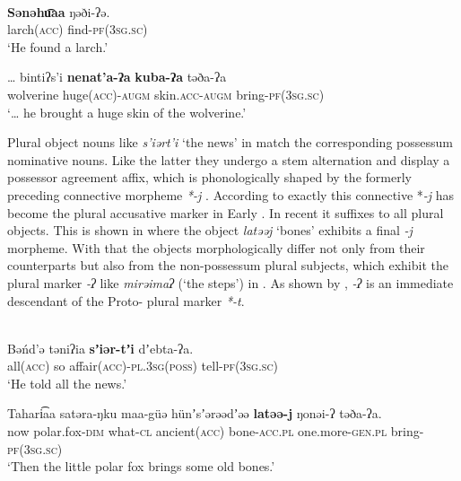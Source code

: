 \documentclass[output=paper]{LSP/langsci}
\begin{document}
\ea%
\label{12-wr-ex:2}
\\
\ea\label{12-wr-ex:2a}
\gll \textbf{Sənəhu͡aa} ŋəði-ʔə.\\
 larch\textsc{(acc)} find-\textsc{pf(3sg.sc)}\\
\glt ‘He found a larch.’

\ex\label{12-wr-ex:2b}
\gll … bintiʔs’i \textbf{nenat’a-ʔa} \textbf{kuba-ʔa} təða-ʔa\\
 {} wolverine huge\textsc{(acc)}-\textsc{augm} skin\textsc{.acc}-\textsc{augm} bring-\textsc{pf(3sg.sc)}\\
\glt ‘… he brought a huge skin of the wolverine.’
\z
\z

Plural  object nouns like \textit{s’iərt’i} ‘the news’ in  match the corresponding possessum nominative nouns. Like the latter they undergo a stem alternation and display a possessor agreement affix, which is phonologically shaped by the formerly preceding connective morpheme \textit{*-j} \citep[84]{WagnerNagy2002Chrestomathia}. According to \citet[29--32]{Janhunen1982Structure} exactly this  connective *\textit{-j} has become the plural accusative marker in Early . In recent  it suffixes to all  plural objects. This is shown in  where the  object \textit{latəəj} ‘bones’ exhibits a final \textit{-j} morpheme. With that the  objects morphologically differ not only from their  counterparts but also from the non-possessum plural subjects, which exhibit the plural marker \textit{-ʔ} like \textit{mirəimaʔ} (‘the steps’) in . As shown by \citet[238]{Mikola1988Geschichte}, \textit{-ʔ} is an immediate descendant of the Proto- plural marker \textit{*-t}. 

\ea \label{12-wr-ex:3}
\\

\ea \label{12-wr-ex:3a}
\gll Bəńd’ə təniʔia \textbf{sʼiər-tʼi} dʼebta-ʔa.\\
 all\textsc{(acc)} so affair\textsc{(acc)}-\textsc{pl.3sg(poss)} tell-\textsc{pf(3sg.sc)}\\
\glt  ‘He told all the news.’ %

\ex \label{12-wr-ex:3b}
\gll Tahari͡aa satəra-ŋku maa-güǝ hünʼsʼərəədʼəə \textbf{latəə-j} ŋonəi-ʔ təða-ʔa.\\
 now polar.fox-\textsc{dim} what-\textsc{cl} ancient(\textsc{acc)} bone-\textsc{acc.pl}  one.more-\textsc{gen.pl} bring-\textsc{pf(3sg.sc)}\\
\glt  ‘Then the little polar fox brings some old bones.’ %
\end{document}
